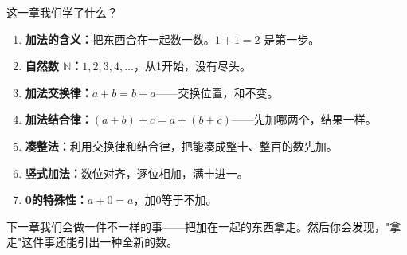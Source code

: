 
这一章我们学了什么？

\begin{enumerate}
  \item \textbf{加法的含义：}把东西合在一起数一数。$1+1=2$ 是第一步。
  \item \textbf{自然数 $\mathbb{N}$：}$1,2,3,4,\ldots$，从1开始，没有尽头。
  \item \textbf{加法交换律：}$a+b = b+a$——交换位置，和不变。
  \item \textbf{加法结合律：}$(a+b)+c = a+(b+c)$——先加哪两个，结果一样。
  \item \textbf{凑整法：}利用交换律和结合律，把能凑成整十、整百的数先加。
  \item \textbf{竖式加法：}数位对齐，逐位相加，满十进一。
  \item \textbf{0的特殊性：}$a+0=a$，加0等于不加。
\end{enumerate}

下一章我们会做一件不一样的事——把加在一起的东西拿走。然后你会发现，"拿走"这件事还能引出一种全新的数。

\bigskip

\begin{center}
\end{center}
